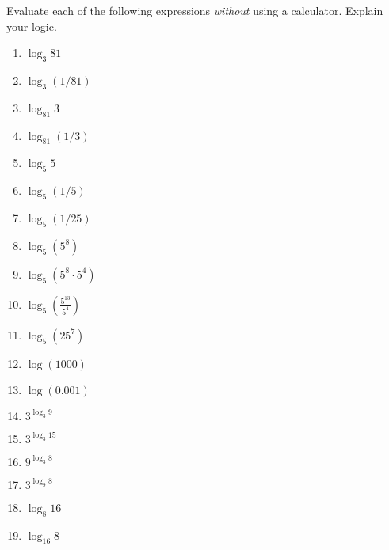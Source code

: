 \documentclass{ximera}
\begin{document}
\begin{question}  \label{Qdr435rtgfg}
Evaluate each of the following expressions \emph{without} using a calculator. Explain your logic.
\begin{enumerate}
\item $\log_3 81$

\item $\log_3 (1/81)$

\item $\log_{81}3$

\item $\log_{81} (1/3)$

\item $\log_5 5$

\item $\log_5 (1/5)$

\item $\log_5 (1/25)$

\item $\log_5 (5^8)$

\item $\log_5(5^8 \cdot 5^4)$

\item $\log_5\left(  \frac{5^{13}}{5^{4}} \right)$

\item $\log_5(25^7)$

\item $\log (1000)$

\item $\log (0.001)$

\item $3^{\log_3 9}$

\item $3^{\log_3 15}$

\item $9^{\log_3 8}$

\item $3^{\log_9 8}$

\item $\log_8 16$

\item $\log_{16}8$

\end{enumerate}
\end{question}
\end{document}

